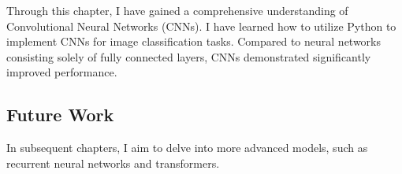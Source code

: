 
Through this chapter, I have gained a comprehensive understanding of Convolutional Neural Networks (CNNs). I have learned how to utilize Python to implement CNNs for image classification tasks. Compared to neural networks consisting solely of fully connected layers, CNNs demonstrated significantly improved performance.

\subsection{Future Work}
In subsequent chapters, I aim to delve into more advanced models, such as recurrent neural networks and transformers.